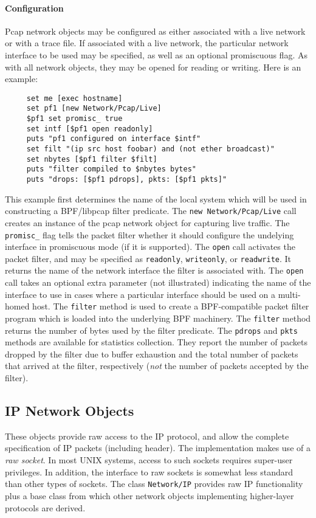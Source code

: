 \paragraph{Configuration}
Pcap network objects may be configured as either associated with a
live network or with a trace file.
If associated with a live network, the particular network interface
to be used may be specified, as well as an optional promiscuous flag.
As with all network objects, they may be opened for reading or writing.
Here is an example:
\begin{verbatim}
     set me [exec hostname]
     set pf1 [new Network/Pcap/Live]
     $pf1 set promisc_ true
     set intf [$pf1 open readonly]
     puts "pf1 configured on interface $intf"
     set filt "(ip src host foobar) and (not ether broadcast)"
     set nbytes [$pf1 filter $filt]
     puts "filter compiled to $nbytes bytes"
     puts "drops: [$pf1 pdrops], pkts: [$pf1 pkts]"
\end{verbatim}
This example first determines the name of the local system which
will be used in constructing a BPF/libpcap filter predicate.
The {\tt new Network/Pcap/Live} call creates an instance of the
pcap network object for capturing live traffic.
The {\tt promisc\_} flag tells the packet filter whether it should
configure the undelying interface in promiscuous mode (if it is supported).
The {\tt open} call activates the packet filter, and may be specified
as {\tt readonly}, {\tt writeonly}, or {\tt readwrite}.
It returns the name of the network interface the filter is associated
with.
The {\tt open} call takes an optional extra parameter (not illustrated)
indicating the name of the interface to use in cases where a particular
interface should be used on a multi-homed host.
The {\tt filter} method is used to create a BPF-compatible packet
filter program which is loaded into the underlying BPF machinery.
The {\tt filter} method returns the number of bytes used by the
filter predicate. 
The {\tt pdrops} and {\tt pkts} methods are available for statistics
collection.
They report the number of packets dropped by the filter due to 
buffer exhaustion and the
total number of packets that arrived at the filter, respectively
({\em not} the number of packets accepted by the filter).

\subsection{IP Network Objects}

These objects provide raw access to the IP protocol, and allow
the complete specification of IP packets (including header).
The implementation makes use of a {\em raw socket}.
In most UNIX systems, access to such sockets requires super-user privileges.
In addition, the interface to raw sockets is somewhat less standard than
other types of sockets.
The class {\tt Network/IP} provides raw IP functionality plus a
base class from
which other network objects implementing higher-layer protocols
are derived.

